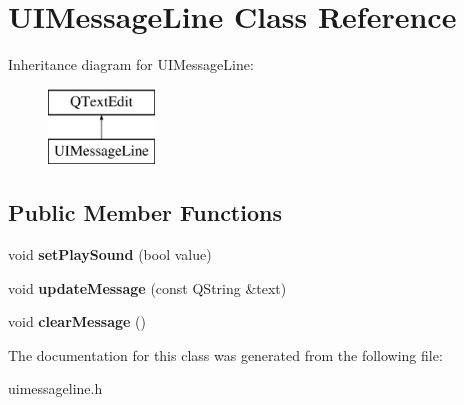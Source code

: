 \hypertarget{class_u_i_message_line}{}\section{U\+I\+Message\+Line Class Reference}
\label{class_u_i_message_line}
Inheritance diagram for U\+I\+Message\+Line\+:\begin{figure}[H]
\begin{center}
\leavevmode
\includegraphics[height=2.000000cm]{class_u_i_message_line}
\end{center}
\end{figure}
\subsection*{Public Member Functions}
\begin{DoxyCompactItemize}
\item 
void {\bfseries set\+Play\+Sound} (bool value)\hypertarget{class_u_i_message_line_a35cd330f78382563aaa4196b6f0718db}{}\label{class_u_i_message_line_a35cd330f78382563aaa4196b6f0718db}

\item 
void {\bfseries update\+Message} (const Q\+String \&text)\hypertarget{class_u_i_message_line_aeb59868f0cb5d85cefbf1c6c779c4d29}{}\label{class_u_i_message_line_aeb59868f0cb5d85cefbf1c6c779c4d29}

\item 
void {\bfseries clear\+Message} ()\hypertarget{class_u_i_message_line_a4d8ef8b32c1643d01eb54958385cae71}{}\label{class_u_i_message_line_a4d8ef8b32c1643d01eb54958385cae71}

\end{DoxyCompactItemize}


The documentation for this class was generated from the following file\+:\begin{DoxyCompactItemize}
\item 
uimessageline.\+h\end{DoxyCompactItemize}
